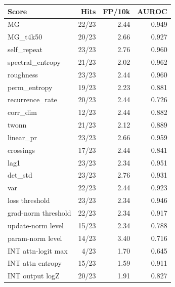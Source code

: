 \begin{tabular}{lrrr}
\toprule
Score & Hits & FP/10k & AUROC \\
\midrule
MG & 22/23 & 2.44 & 0.949 \\
MG\_t4k50 & 20/23 & 2.66 & 0.927 \\
self\_repeat & 23/23 & 2.76 & 0.960 \\
spectral\_entropy & 21/23 & 2.02 & 0.962 \\
roughness & 23/23 & 2.44 & 0.960 \\
perm\_entropy & 19/23 & 2.23 & 0.881 \\
recurrence\_rate & 20/23 & 2.44 & 0.726 \\
corr\_dim & 12/23 & 2.44 & 0.882 \\
twonn & 21/23 & 2.12 & 0.889 \\
linear\_pr & 23/23 & 2.66 & 0.959 \\
crossings & 17/23 & 2.44 & 0.841 \\
lag1 & 23/23 & 2.34 & 0.951 \\
det\_std & 23/23 & 2.76 & 0.931 \\
var & 22/23 & 2.44 & 0.923 \\
loss threshold & 23/23 & 2.34 & 0.946 \\
grad-norm threshold & 22/23 & 2.34 & 0.917 \\
update-norm level & 15/23 & 2.34 & 0.788 \\
param-norm level & 14/23 & 3.40 & 0.716 \\
INT attn-logit max & 4/23 & 1.70 & 0.645 \\
INT attn entropy & 15/23 & 1.59 & 0.911 \\
INT output logZ & 20/23 & 1.91 & 0.827 \\
\bottomrule
\end{tabular}
